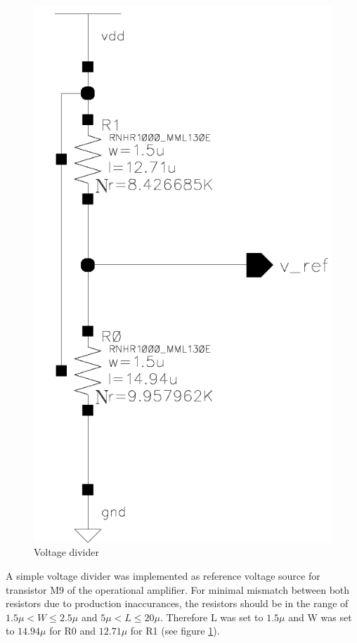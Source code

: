 \documentclass[parskip,oneside,colorbacktitle,10pt,accentcolor=tud1b,table]{tudreport}
\begin{document}
{\begin{figure}
	\centering
    \includegraphics[scale=0.25]{v_ref_schem}
    \caption{Voltage divider}
    \label{fig:vrefschem}
\end{figure}

A simple voltage divider was implemented as reference voltage source for transistor M9 of the operational amplifier. For minimal mismatch between both resistors due to production inaccurances, the resistors should be in the range of $1.5\mu < W \leq 2.5\mu$ and $5\mu < L \leq 20\mu$. Therefore L was set to $1.5\mu$ and W was set to $14.94\mu$ for R0 and $12.71\mu$ for R1 (see figure \ref{fig:vrefschem}).

}
\end{document}

